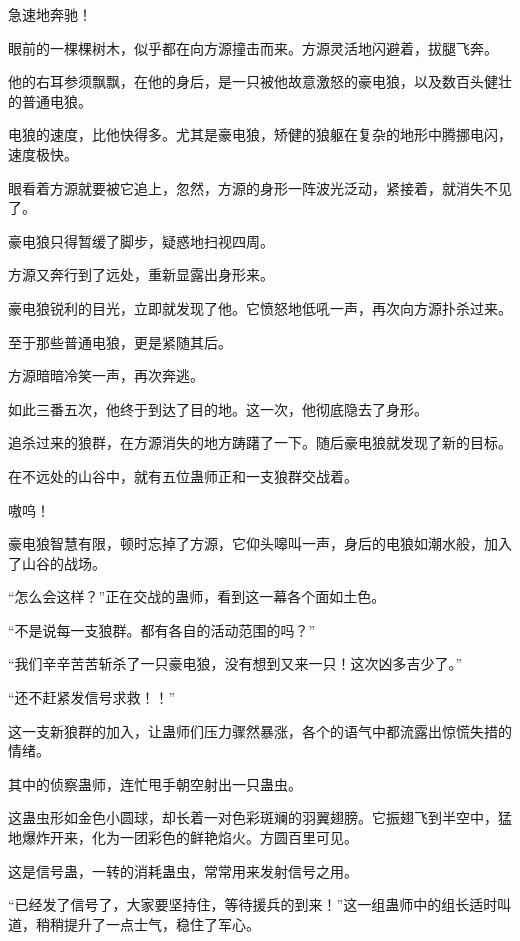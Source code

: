 
\begin{this_body}

急速地奔驰！

眼前的一棵棵树木，似乎都在向方源撞击而来。方源灵活地闪避着，拔腿飞奔。

他的右耳参须飘飘，在他的身后，是一只被他故意激怒的豪电狼，以及数百头健壮的普通电狼。

电狼的速度，比他快得多。尤其是豪电狼，矫健的狼躯在复杂的地形中腾挪电闪，速度极快。

眼看着方源就要被它追上，忽然，方源的身形一阵波光泛动，紧接着，就消失不见了。

豪电狼只得暂缓了脚步，疑惑地扫视四周。

方源又奔行到了远处，重新显露出身形来。

豪电狼锐利的目光，立即就发现了他。它愤怒地低吼一声，再次向方源扑杀过来。

至于那些普通电狼，更是紧随其后。

方源暗暗冷笑一声，再次奔逃。

如此三番五次，他终于到达了目的地。这一次，他彻底隐去了身形。

追杀过来的狼群，在方源消失的地方踌躇了一下。随后豪电狼就发现了新的目标。

在不远处的山谷中，就有五位蛊师正和一支狼群交战着。

嗷呜！

豪电狼智慧有限，顿时忘掉了方源，它仰头嗥叫一声，身后的电狼如潮水般，加入了山谷的战场。

“怎么会这样？”正在交战的蛊师，看到这一幕各个面如土色。

“不是说每一支狼群。都有各自的活动范围的吗？”

“我们辛辛苦苦斩杀了一只豪电狼，没有想到又来一只！这次凶多吉少了。”

“还不赶紧发信号求救！！”

这一支新狼群的加入，让蛊师们压力骤然暴涨，各个的语气中都流露出惊慌失措的情绪。

其中的侦察蛊师，连忙甩手朝空射出一只蛊虫。

这蛊虫形如金色小圆球，却长着一对色彩斑斓的羽翼翅膀。它振翅飞到半空中，猛地爆炸开来，化为一团彩色的鲜艳焰火。方圆百里可见。

这是信号蛊，一转的消耗蛊虫，常常用来发射信号之用。

“已经发了信号了，大家要坚持住，等待援兵的到来！”这一组蛊师中的组长适时叫道，稍稍提升了一点士气，稳住了军心。


\end{this_body}
